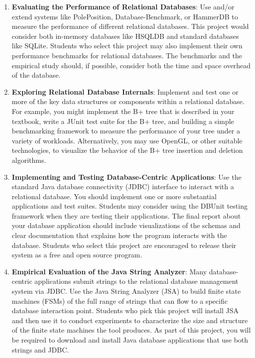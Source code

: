 \begin{enumerate}

  \item {\bf Evaluating the Performance of Relational Databases}: Use and/or extend systems like PolePosition,
    Database-Benchmark, or HammerDB to measure the performance of different relational databases.  This project would
    consider both in-memory databases like HSQLDB and standard databases like SQLite.  Students who select this project
    may also implement their own performance benchmarks for relational databases.  The benchmarks and
    the empirical study should, if possible, consider both the time and space overhead of the database.

  \item {\bf Exploring Relational Database Internals}: Implement and test one or more of the key data structures or
    components within a relational database.  For example, you might implement the B+ tree that is described in your
    textbook, write a JUnit test suite for the B+ tree, and building a simple benchmarking framework to measure the
    performance of your tree under a variety of workloads.  Alternatively, you may use OpenGL, or other suitable
    technologies, to visualize the behavior of the B+ tree insertion and deletion algorithms.

  \item {\bf Implementing and Testing Database-Centric Applications}: Use the standard Java database connectivity (JDBC)
    interface to interact with a relational database.  You should implement one or more substantial applications and
    test suites.  Students may consider using the DBUnit testing framework when they are testing their applications.
    The final report about your database application should include visualizations of the schemas and clear
    documentation that explains how the program interacts with the database.  Students who select this project are
    encouraged to release their system as a free and open source program.  

  \item {\bf Empirical Evaluation of the Java String Analyzer}: Many database-centric applications submit strings to the
    relational database management system via JDBC.  Use the Java String Analyzer (JSA) to build finite state machines
    (FSMs) of the full range of strings that can flow to a specific database interaction point.  Students who pick this
    project will install JSA and then use it to conduct experiments to characterize the size and structure of the finite
    state machines the tool produces.  As part of this project, you will be required to download and install Java
    database applications that use both strings and JDBC.  


\end{enumerate}

